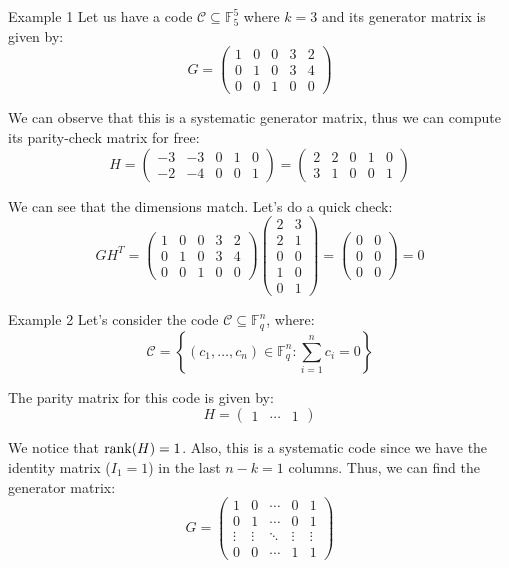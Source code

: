 \documentclass[a4paper]{article}
\begin{document}
\begin{parag}{Example 1}
    Let us have a code $\mathcal{C} \subseteq \mathbb{F}_5^5$ where $k = 3$ and its generator matrix is given by: 
    \[G = \begin{pmatrix} 1 & 0 & 0 & 3 & 2 \\ 0 & 1 & 0 & 3 & 4 \\ 0 & 0 & 1 & 0 & 0 \end{pmatrix} \]
    
    We can observe that this is a systematic generator matrix, thus we can compute its parity-check matrix for free: 
    \[H = \begin{pmatrix} -3 & -3 & 0 & 1 & 0 \\ -2 & -4 & 0 & 0 & 1 \end{pmatrix} = \begin{pmatrix} 2 & 2 & 0 & 1 & 0 \\ 3 & 1 & 0 & 0 & 1 \end{pmatrix} \]
    
    We can see that the dimensions match. Let's do a quick check: 
    \[G H^T = \begin{pmatrix} 1 & 0 & 0 & 3 & 2 \\ 0 & 1 & 0 & 3 & 4 \\ 0 & 0 & 1 & 0 & 0 \end{pmatrix} \begin{pmatrix} 2 & 3 \\ 2 & 1 \\ 0 & 0 \\ 1 & 0 \\ 0 & 1 \end{pmatrix} = \begin{pmatrix} 0 & 0 \\ 0 & 0 \\ 0 & 0 \end{pmatrix} = 0\]
\end{parag}

\begin{parag}{Example 2}
    Let's consider the code $\mathcal{C} \subseteq \mathbb{F}_q^n$, where: 
    \[\mathcal{C} = \left\{\left(c_1, \ldots, c_n\right) \in \mathbb{F}_q^n : \sum_{i=1}^{n} c_i = 0\right\}\]
    
    The parity matrix for this code is given by: 
    \[H = \begin{pmatrix} 1 & \cdots & 1 \end{pmatrix} \]
    
    We notice that $\rank\left(H\right) = 1$. Also, this is a systematic code since we have the identity matrix ($I_1 = 1$) in the last $n-k = 1$ columns. Thus, we can find the generator matrix: 
    \[G = \begin{pmatrix} 1 & 0 & \cdots & 0 & 1 \\ 0 & 1 & \cdots & 0 & 1 \\ \vdots & \vdots & \ddots & \vdots & \vdots \\ 0 & 0 & \cdots & 1 & 1 \end{pmatrix} \]
\end{parag}
\end{document}
